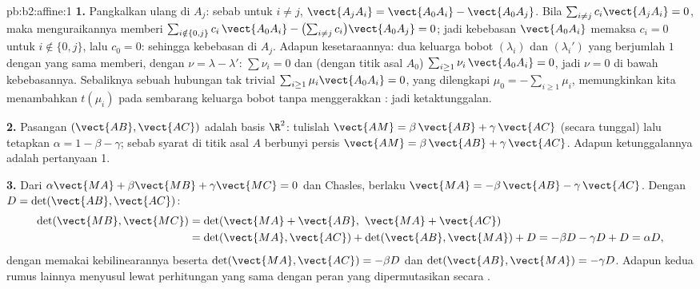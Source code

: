 \begin{solution}{pb:b2:affine:1}
\textbf{1.} Pangkalkan ulang di $A_j$: sebab untuk $i \neq j$, $\vect{A_jA_i} =
\vect{A_0A_i} - \vect{A_0A_j}$. Bila $\sum_{i \neq j}
c_i\vect{A_jA_i} = 0$, maka menguraikannya memberi $\sum_{i \notin \{0,
j\}} c_i\,\vect{A_0A_i} - \bigl(\sum_{i\neq j}
c_i\bigr)\vect{A_0A_j} = 0$; jadi kebebasan
$\vect{A_0A_i}$ memaksa $c_i = 0$ untuk $i \notin \{0, j\}$, lalu
$c_0 = 0$: sehingga kebebasan di $A_j$. Adapun kesetaraannya: dua
keluarga bobot $(\lambda_i)$ dan $(\lambda_i')$ yang berjumlah $1$
dengan  yang sama memberi, dengan $\nu = \lambda -
\lambda'$: $\sum\nu_i = 0$ dan (dengan titik asal $A_0$) $\sum_{i \geq
1}\nu_i\,\vect{A_0A_i} = 0$, jadi $\nu = 0$ di bawah kebebasannya.
Sebaliknya sebuah hubungan tak trivial $\sum_{i\geq1}\mu_i
\vect{A_0A_i} = 0$, yang dilengkapi $\mu_0 = -\sum_{i\geq1}
\mu_i$, memungkinkan kita menambahkan $t(\mu_i)$ pada sembarang keluarga bobot tanpa
menggerakkan : jadi ketaktunggalan.

\textbf{2.} Pasangan $(\vect{AB}, \vect{AC})$ adalah basis $\R^2$:
tulislah $\vect{AM} = \beta\,\vect{AB} + \gamma\,\vect{AC}$
(secara tunggal) lalu tetapkan $\alpha = 1 - \beta - \gamma$; sebab syarat
 di titik asal $A$ berbunyi persis $\vect{AM} =
\beta\,\vect{AB} + \gamma\,\vect{AC}$. Adapun ketunggalannya adalah pertanyaan
1.

\textbf{3.} Dari $\alpha\vect{MA} + \beta\vect{MB} +
\gamma\vect{MC} = 0$ dan Chasles, berlaku $\vect{MA} =
-\beta\,\vect{AB} - \gamma\,\vect{AC}$. Dengan $D =
\det(\vect{AB}, \vect{AC})$:
\begin{align*}
\det(\vect{MB}, \vect{MC})
&= \det(\vect{MA} + \vect{AB},\ \vect{MA} + \vect{AC})\\
&= \det(\vect{MA}, \vect{AC}) + \det(\vect{AB}, \vect{MA}) +
D = -\beta D - \gamma D + D = \alpha D,
\end{align*}
dengan memakai kebilinearannya beserta $\det(\vect{MA}, \vect{AC}) = -\beta D$
dan $\det(\vect{AB}, \vect{MA}) = -\gamma D$. Adapun kedua rumus
lainnya menyusul lewat perhitungan yang sama dengan peran yang
dipermutasikan secara .


\end{solution}
